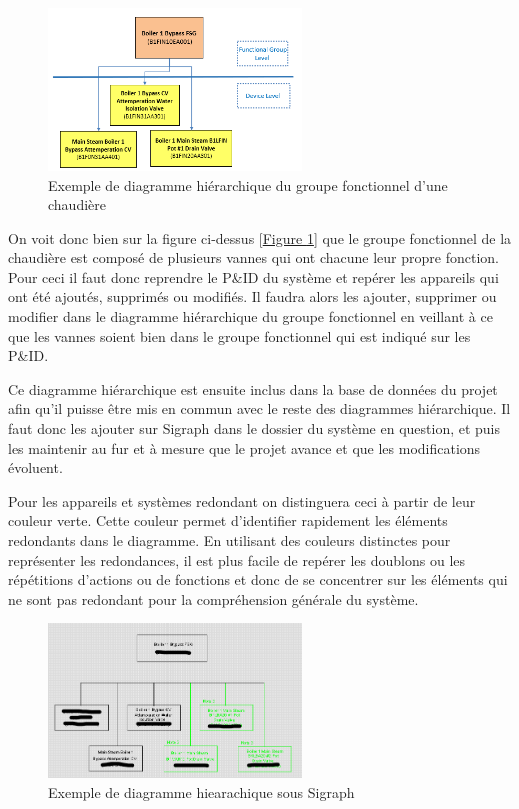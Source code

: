 \documentclass[11pt, openright]{book}
\begin{document}
\begin{figure}[ht!]
    \centering
    \includegraphics[width=0.6\textwidth]{./object/diag.png}
    \caption{Exemple de diagramme hiérarchique du groupe fonctionnel d'une chaudière}
    \label{fig:diag}
\end{figure}

On voit donc bien sur la figure ci-dessus [\hyperref[fig:diag]{Figure \ref{fig:diag}}] que le groupe fonctionnel de la chaudière est composé de plusieurs vannes qui ont chacune leur propre fonction. Pour ceci il faut donc reprendre le P\&ID du système et repérer les appareils qui ont été ajoutés, supprimés ou modifiés. Il faudra alors les ajouter, supprimer ou modifier dans le diagramme hiérarchique du groupe fonctionnel en veillant à ce que les vannes soient bien dans le groupe fonctionnel qui est indiqué sur les P\&ID.

Ce diagramme hiérarchique est ensuite inclus dans la base de données du projet afin qu'il puisse être mis en commun avec le reste des diagrammes hiérarchique. Il faut donc les ajouter sur Sigraph dans le dossier du système en question, et puis les maintenir au fur et à mesure que le projet avance et que les modifications évoluent.

Pour les appareils et systèmes redondant on distinguera ceci à partir de leur couleur verte. Cette couleur permet d'identifier rapidement les éléments redondants dans le diagramme. En utilisant des couleurs distinctes pour représenter les redondances, il est plus facile de repérer les doublons ou les répétitions d'actions ou de fonctions et donc de se concentrer sur les éléments qui ne sont pas redondant pour la compréhension générale du système.

\newpage
\begin{figure}[ht!]
    \centering
    \includegraphics[width=0.6\textwidth]{./object/SigH.png}
    \caption{Exemple de diagramme hiearachique sous Sigraph}
\end{figure}
\end{document}
